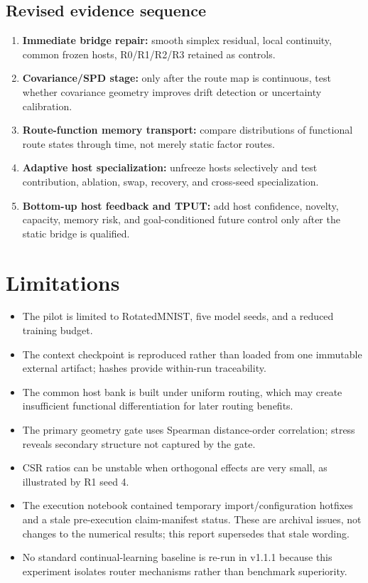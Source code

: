 \documentclass[11pt,a4paper]{article}
\begin{document}
\subsection{Revised evidence sequence}
\begin{enumerate}
\item \textbf{Immediate bridge repair:} smooth simplex residual, local continuity, common frozen hosts, R0/R1/R2/R3 retained as controls.
\item \textbf{Covariance/SPD stage:} only after the route map is continuous, test whether covariance geometry improves drift detection or uncertainty calibration.
\item \textbf{Route-function memory transport:} compare distributions of functional route states through time, not merely static factor routes.
\item \textbf{Adaptive host specialization:} unfreeze hosts selectively and test contribution, ablation, swap, recovery, and cross-seed specialization.
\item \textbf{Bottom-up host feedback and TPUT:} add host confidence, novelty, capacity, memory risk, and goal-conditioned future control only after the static bridge is qualified.
\end{enumerate}

\section{Limitations}
\begin{itemize}
\item The pilot is limited to RotatedMNIST, five model seeds, and a reduced training budget.
\item The context checkpoint is reproduced rather than loaded from one immutable external artifact; hashes provide within-run traceability.
\item The common host bank is built under uniform routing, which may create insufficient functional differentiation for later routing benefits.
\item The primary geometry gate uses Spearman distance-order correlation; stress reveals secondary structure not captured by the gate.
\item CSR ratios can be unstable when orthogonal effects are very small, as illustrated by R1 seed 4.
\item The execution notebook contained temporary import/configuration hotfixes and a stale pre-execution claim-manifest status. These are archival issues, not changes to the numerical results; this report supersedes that stale wording.
\item No standard continual-learning baseline is re-run in v1.1.1 because this experiment isolates router mechanisms rather than benchmark superiority.
\end{itemize}
\end{document}
